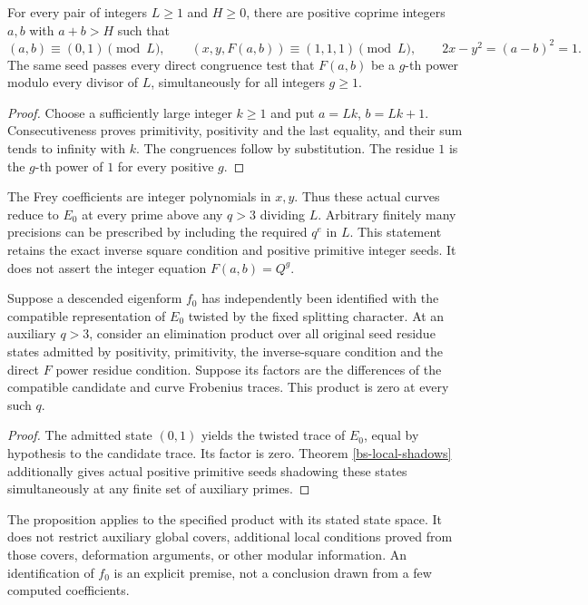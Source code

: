 \begin{theorem}
\label{bs-local-shadows}
For every pair of integers $L\ge1$ and $H\ge0$, there are positive
coprime integers $a,b$ with $a+b>H$ such that
\[
 (a,b)\equiv(0,1)\pmod L,\qquad
 (x,y,F(a,b))\equiv(1,1,1)\pmod L,
 \qquad 2x-y^2=(a-b)^2=1.
\]
The same seed passes every direct congruence test that $F(a,b)$ be
a $g$-th power modulo every divisor of $L$, simultaneously for all
integers $g\ge1$.
\end{theorem}
\begin{proof}
Choose a sufficiently large integer $k\ge1$ and put
$a=Lk$, $b=Lk+1$. Consecutiveness proves primitivity, positivity
and the last equality, and their sum tends to infinity with $k$.
The congruences follow by substitution. The residue $1$ is the
$g$-th power of $1$ for every positive $g$.
\end{proof}

The Frey coefficients are integer polynomials in $x,y$. Thus these
actual curves reduce to $E_0$ at every prime above any $q>3$ dividing
$L$. Arbitrary finitely many precisions can be prescribed by including
the required $q^e$ in $L$. This statement retains the exact inverse
square condition and positive primitive integer seeds. It does not
assert the integer equation $F(a,b)=Q^g$.

\begin{proposition}
\label{bs-conditional-mazur}
Suppose a descended eigenform $f_0$ has independently been identified
with the compatible representation of $E_0$ twisted by the fixed
splitting character. At an auxiliary $q>3$, consider an elimination
product over all original seed residue states admitted by positivity,
primitivity, the inverse-square condition and the direct $F$ power
residue condition. Suppose its factors are the differences of the
compatible candidate and curve Frobenius traces. This product is zero
at every such $q$.
\end{proposition}
\begin{proof}
The admitted state $(0,1)$ yields the twisted trace of $E_0$, equal
by hypothesis to the candidate trace. Its factor is zero. Theorem
\ref{bs-local-shadows} additionally gives actual positive primitive
seeds shadowing these states simultaneously at any finite set of
auxiliary primes.
\end{proof}

The proposition applies to the specified product with its stated
state space. It does not restrict auxiliary global covers, additional
local conditions proved from those covers, deformation arguments, or
other modular information. An identification of $f_0$ is an explicit
premise, not a conclusion drawn from a few computed coefficients.

